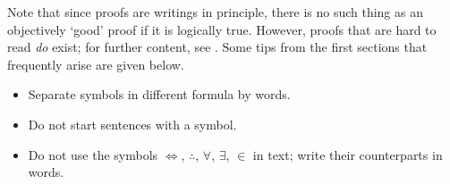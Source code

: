 Note that since proofs are writings in principle,
there is no such thing as an objectively `good' proof
if it is logically true.
However, proofs that are hard to read \emph{do} exist;
for further content, see \cite{Knuth89}.
Some tips from the first sections that frequently arise are given below.
\begin{itemize}
    \item Separate symbols in different formula by words.
    \item Do not start sentences with a symbol.
    \item Do not use the symbols
    \(\iff\),
    \(\therefore\),
    \(\forall\),
    \(\exists\),
    \(\in\)
    in text;
    write their counterparts in words.
\end{itemize}